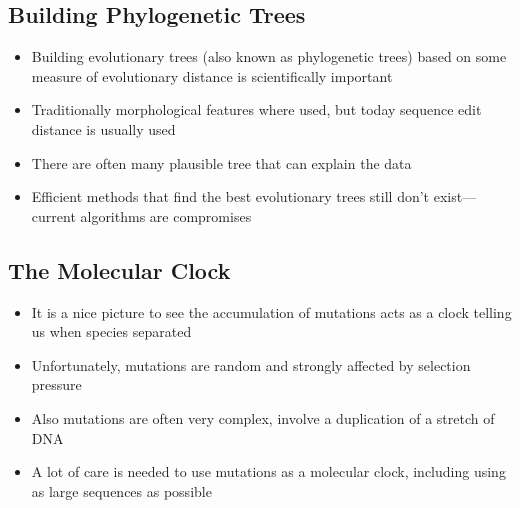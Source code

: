 \Outline %

\begin{slide}
\section{Building Phylogenetic Trees}

\begin{PauseHighLight}
  \begin{itemize}
  \item Building evolutionary trees (also known as phylogenetic trees) based
    on some measure of evolutionary distance is scientifically
    important\pause
  \item Traditionally morphological features where used, but today
    sequence edit distance is usually used\pause
  \item There are often many plausible tree that can explain the
    data\pause
  \item Efficient methods that find the best evolutionary trees still
    don't exist---current algorithms are compromises\pause
  \end{itemize}
\end{PauseHighLight}

\end{slide}


\begin{slide}
\section{The Molecular Clock}

\begin{PauseHighLight}
  \begin{itemize}
  \item It is a nice picture to see the accumulation of mutations acts as a
    clock telling us when species separated\pause
  \item Unfortunately, mutations are random and strongly affected by
    selection pressure\pause
  \item Also mutations are often very complex, involve a duplication of
    a stretch of DNA\pause
  \item A lot of care is needed to use mutations as a molecular clock,
    including using as large sequences as possible\pause
  \end{itemize}
\end{PauseHighLight}

\end{slide}

